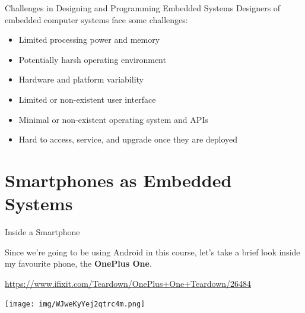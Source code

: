 \documentclass[aspectratio=169]{beamer}
\begin{document}
\begin{frame}{Challenges in Designing and Programming Embedded Systems}
Designers of embedded computer systems face some challenges: \\
\begin{itemize}
\item Limited processing power and memory
\item Potentially harsh operating environment
\item Hardware and platform variability
\item Limited or non-existent user interface
\item Minimal or non-existent operating system and APIs
\item Hard to access, service, and upgrade once they are deployed
\end{itemize}
\end{frame}



\section{Smartphones as Embedded Systems}	



	\begin{frame}{Inside a Smartphone}
		
		Since we're going to be using Android in this course, let's take a brief look
		inside my favourite phone, the {\bf OnePlus One}.
		
		\href{https://www.ifixit.com/Teardown/OnePlus+One+Teardown/26484}{https://www.ifixit.com/Teardown/OnePlus+One+Teardown/26484}
		
		\vspace{1em}		
		
		\centering
		\texttt{[image: img/WJweKyYej2qtrc4m.png]}
			
	\end{frame}
\end{document}
